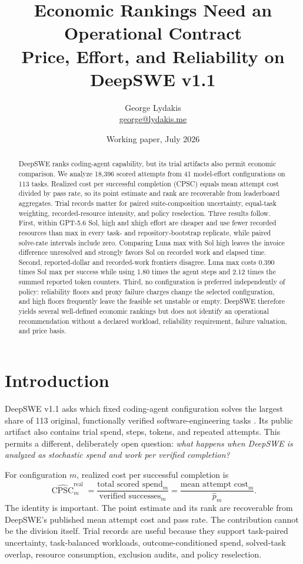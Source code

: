 \documentclass[11pt]{article}
\title{\textbf{Economic Rankings Need an Operational Contract}\\[0.35em]
\large Price, Effort, and Reliability on DeepSWE v1.1}
\author{George Lydakis\\\href{mailto:george@lydakis.me}{george@lydakis.me}}
\date{Working paper, July 2026}
\newcommand{\cpsc}{\operatorname{CPSC}}
\begin{document}
\maketitle

\begin{abstract}
DeepSWE ranks coding-agent capability, but its trial artifacts also permit economic comparison. We
analyze 18,396 scored attempts from 41 model-effort configurations on 113 tasks. Realized cost per
successful completion (CPSC) equals mean attempt cost divided by pass rate, so its point estimate
and rank are recoverable from leaderboard aggregates. Trial records matter for paired
suite-composition uncertainty, equal-task weighting, recorded-resource intensity, and policy
reselection. Three results follow. First, within GPT-5.6 Sol, high and xhigh effort are cheaper and
use fewer recorded resources than max in every task- and repository-bootstrap replicate, while
paired solve-rate intervals include zero. Comparing Luna max with Sol high leaves the invoice
difference unresolved and strongly favors Sol on recorded work and elapsed time. Second,
reported-dollar and recorded-work frontiers disagree. Luna max costs 0.390 times Sol max per
success while using 1.80 times the agent steps and 2.12 times the summed reported token counters.
Third, no configuration is preferred independently of policy: reliability floors and proxy failure
charges change the selected configuration, and high floors frequently leave the feasible set
unstable or empty. DeepSWE therefore yields several well-defined economic rankings but does not
identify an operational recommendation without a declared workload, reliability requirement,
failure valuation, and price basis.
\end{abstract}

\section{Introduction}

DeepSWE v1.1 asks which fixed coding-agent configuration solves the largest share of 113 original,
functionally verified software-engineering tasks \citep{huang2026deepswe}. Its public artifact also
contains trial spend, steps, tokens, and repeated attempts. This permits a different, deliberately
open question: \emph{what happens when DeepSWE is analyzed as stochastic spend and work per
verified completion?}

For configuration $m$, realized cost per successful completion is
\begin{equation}
\widehat{\cpsc}^{\mathrm{real}}_m
=\frac{\text{total scored spend}_m}{\text{verified successes}_m}
=\frac{\text{mean attempt cost}_m}{\widehat p_m}.
\label{eq:aggregate-identity}
\end{equation}
The identity is important. The point estimate and its rank are recoverable from DeepSWE's published
mean attempt cost and pass rate. The contribution cannot be the division itself. Trial records are
useful because they support task-paired uncertainty, task-balanced workloads, outcome-conditioned
spend, solved-task overlap, resource consumption, exclusion audits, and policy reselection.
\end{document}
